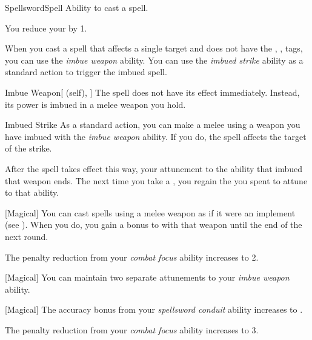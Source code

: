     \begin{feat}{Spellsword}{Spell}
        \featpre Ability to cast a spell.

         You reduce your  by 1.

         When you cast a spell that affects a single target and does not have the , ,  tags,
            you can use the \textit{imbue weapon} ability.
            You can use the \textit{imbued strike} ability as a standard action to trigger the imbued spell.
        \begin{attuneability}{Imbue Weapon}[ (self), ]
            The spell does not have its effect immediately.
            Instead, its power is imbued in a melee weapon you hold.
        \end{attuneability}

        \begin{freeability}{Imbued Strike}
            As a standard action, you can make a melee  using a weapon you have imbued with the \textit{imbue weapon} ability.
            If you do, the spell affects the target of the strike.

            After the spell takes effect this way, your attunement to the ability that imbued that weapon ends.
            The next time you take a , you regain the  you spent to attune to that ability.
        \end{freeability}

        [Magical] You can cast spells using a melee weapon as if it were an implement (see ).
        When you do, you gain a  bonus to  with that weapon until the end of the next round.

         The penalty reduction from your \textit{combat focus} ability increases to 2.

        [Magical] You can maintain two separate attunements to your \textit{imbue weapon} ability.

        [Magical] The accuracy bonus from your \textit{spellsword conduit} ability increases to .

         The penalty reduction from your \textit{combat focus} ability increases to 3.
    \end{feat}

